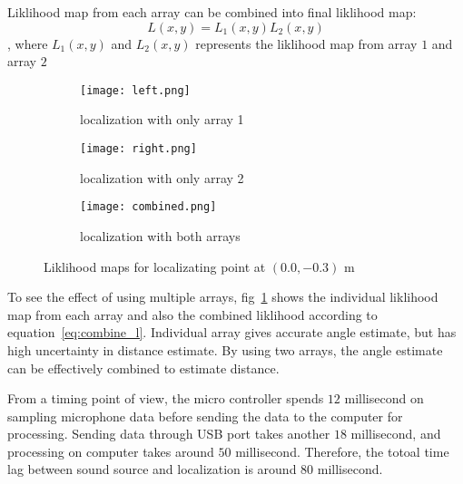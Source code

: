 Liklihood map from each array can be combined into final liklihood map:
\begin{equation}\label{eq:combine_l}
L(x,y) = L_1(x,y) L_2(x,y)
\end{equation}
, where $L_1(x,y)$ and $L_2(x,y)$ represents the liklihood map from array $1$ and array $2$

\begin{figure}[]
  \centering
  \begin{subfigure}[]{.15\textwidth}
    \texttt{[image: left.png]}
    \caption{localization with only array 1}
  \end{subfigure}
  \begin{subfigure}[]{.15\textwidth}
    \texttt{[image: right.png]}
    \caption{localization with only array 2}
  \end{subfigure}
  \begin{subfigure}[]{.15\textwidth}
    \texttt{[image: combined.png]}
    \caption{localization with both arrays}
  \end{subfigure}
  \caption{Liklihood maps for localizating point at $(0.0,-0.3)$ m}
  \label{fig:liklihood}
\end{figure}


To see the effect of using multiple arrays, fig~\ref{fig:liklihood} shows the individual liklihood map from each array and also the combined liklihood according to equation~\ref{eq:combine_l}. Individual array gives accurate angle estimate, but has high uncertainty in distance estimate. By using two arrays, the angle estimate can be effectively combined to estimate distance.



From a timing point of view, the micro controller spends $12$ millisecond on sampling microphone data before sending the data to the computer for processing. Sending data through USB port takes another $18$ millisecond, and processing on computer takes around $50$ millisecond. Therefore, the totoal time lag between sound source and localization is around $80$ millisecond.
